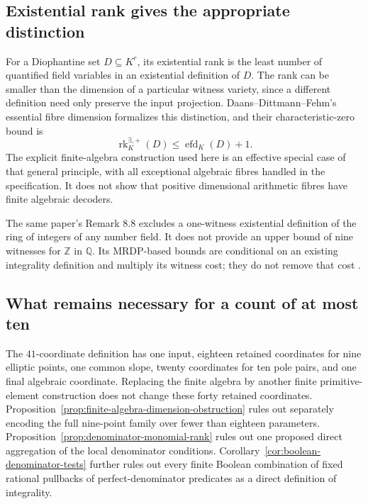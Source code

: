 \documentclass[11pt]{article}
\theoremstyle{definition}
\begin{document}
\subsection{Existential rank gives the appropriate distinction}

For a Diophantine set $D\subseteq K^r$, its existential rank is the
least number of quantified field variables in an existential definition
of $D$.  The rank can be smaller than the dimension of a particular
witness variety, since a different definition need only preserve the
input projection.  Daans--Dittmann--Fehm's essential fibre dimension
formalizes this distinction, and their characteristic-zero bound is
\cite[Corollary 4.21]{DDF2025}
\[
             \operatorname{rk}^{\exists,+}_K(D)
                    \le\operatorname{efd}_K(D)+1.
\]
The explicit finite-algebra construction used here is an effective
special case of that general principle, with all exceptional algebraic
fibres handled in the specification.  It does not show that positive
dimensional arithmetic fibres have finite algebraic decoders.

The same paper's Remark 8.8 excludes a one-witness existential definition
of the ring of integers of any number field.  It does not provide an
upper bound of nine witnesses for $\mathbb Z$ in $\mathbb Q$.
Its MRDP-based bounds are conditional on an existing integrality
definition and multiply its witness cost; they do not remove that
cost \cite[Remark 8.23]{DDF2025}.

\subsection{What remains necessary for a count of at most ten}

The $41$-coordinate definition has one input, eighteen retained
coordinates for nine elliptic points, one common slope, twenty
coordinates for ten pole pairs, and one final algebraic coordinate.
Replacing the finite algebra by another finite primitive-element
construction does not change these forty retained coordinates.
Proposition~\ref{prop:finite-algebra-dimension-obstruction} rules out
separately encoding the full nine-point family over fewer than eighteen
parameters.  Proposition~\ref{prop:denominator-monomial-rank} rules out
one proposed direct aggregation of the local denominator conditions.
Corollary~\ref{cor:boolean-denominator-tests} further rules out every
finite Boolean combination of fixed rational pullbacks of
perfect-denominator predicates as a direct definition of integrality.
\end{document}
